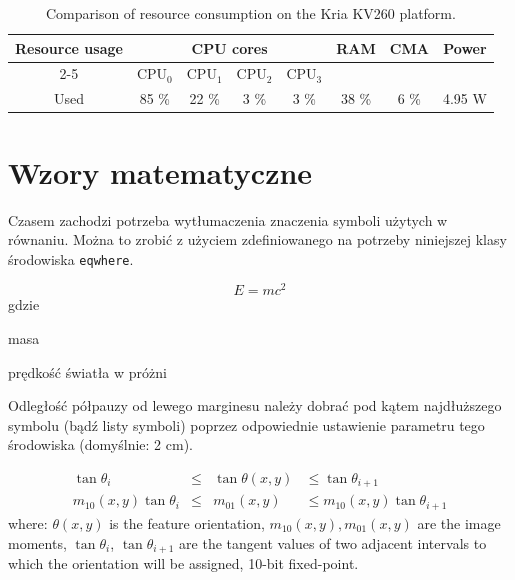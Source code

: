 \begin{table}[!t]
\setlength{\tabcolsep}{6pt}
\centering
\caption{Comparison of resource consumption on the Kria KV260 platform.}
\begin{tabular}{|c|c|c|c|c|c|c|c|}
\hline
\multirow{2}{*}{Resource usage} &  \multicolumn{4}{c|}{CPU cores} & \multirow{2}{*}{RAM} & \multirow{2}{*}{CMA} & \multirow{2}{*}{Power}\\
\cline{2-5}
{} & CPU$_0$ & CPU$_1$ & CPU$_2$ & CPU$_3$ & {} & {} & {}\\ 
\hline
Used & 85 \%  & 22 \%  & 3 \% & 3 \%  & 38 \%  & 6 \%  & 4.95 W\\
\hline
\end{tabular}
\label{tab:consumption}
\end{table}


\section{Wzory matematyczne}

Czasem zachodzi potrzeba wytłumaczenia znaczenia symboli użytych w równaniu. Można to zrobić z użyciem zdefiniowanego na potrzeby niniejszej klasy środowiska \texttt{eqwhere}.

\begin{equation}
E = mc^2
\end{equation}
gdzie
\begin{eqwhere}[2cm]
	\item[$m$] masa
	\item[$c$] prędkość światła w próżni
\end{eqwhere}

Odległość półpauzy od lewego marginesu należy dobrać pod kątem najdłuższego symbolu (bądź listy symboli) poprzez odpowiednie ustawienie parametru tego środowiska (domyślnie: 2 cm).


\begin{equation}
\label{eq:moments_mod_orient_approx}
	\begin{aligned}
		\tan\theta_{i} & \leq & \tan\theta (x,y) & \leq \tan\theta_{i+1} \\
		m_{10}(x,y) \tan\theta_{i} & \leq & m_{01} (x,y) & \leq m_{10} (x,y) \tan\theta_{i+1}
	\end{aligned}
\end{equation}
where:
$\theta(x,y)$ is the feature orientation, 
$m_{10}(x,y), m_{01}(x,y)$ are the image moments, 
$\tan\theta_{i}$, $\tan\theta_{i+1}$ are the tangent values of two adjacent intervals to which the orientation will be assigned, 10-bit fixed-point. 


